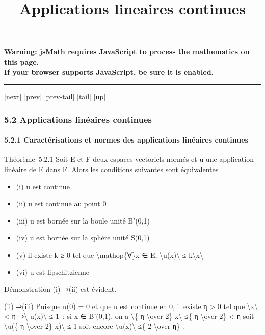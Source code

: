 \documentclass[]{article}
\title{Applications lineaires continues}
\author{}
\date{}
\begin{document}
\maketitle

\textbf{Warning: \href{http://www.math.union.edu/locate/jsMath}{jsMath}
requires JavaScript to process the mathematics on this page.\\ If your
browser supports JavaScript, be sure it is enabled.}

\begin{center}\rule{3in}{0.4pt}\end{center}

{[}\href{coursse29.html}{next}{]} {[}\href{coursse27.html}{prev}{]}
{[}\href{coursse27.html\#tailcoursse27.html}{prev-tail}{]}
{[}\hyperref[tailcoursse28.html]{tail}{]}
{[}\href{coursch6.html\#coursse28.html}{up}{]}

\subsubsection{5.2 Applications linéaires continues}

\paragraph{5.2.1 Caractérisations et normes des applications linéaires
continues}

Théorème~5.2.1 Soit E et F deux espaces vectoriels normés et u une
application linéaire de E dans F. Alors les conditions suivantes sont
équivalentes

\begin{itemize}
\itemsep1pt\parskip0pt
\item
  (i) u est continue
\item
  (ii) u est continue au point 0
\item
  (iii) u est bornée sur la boule unité B'(0,1)
\item
  (iv) u est bornée sur la sphère unité S(0,1)
\item
  (v) il existe k ≥ 0 tel que \textbackslash{}mathop\{∀\}x ∈ E,
  \textbackslash{}\textbar{}u(x)\textbackslash{}\textbar{} ≤
  k\textbackslash{}\textbar{}x\textbackslash{}\textbar{}
\item
  (vi) u est lipschitzienne
\end{itemize}

Démonstration (i) ⇒(ii) est évident.

(ii) ⇒(iii) Puisque u(0) = 0 et que u est continue en 0, il existe η
\textgreater{} 0 tel que
\textbackslash{}\textbar{}x\textbackslash{}\textbar{} \textless{} η
⇒\textbackslash{}\textbar{} u(x)\textbackslash{}\textbar{} ≤ 1~; si x ∈
B'(0,1), on a \textbackslash{}\textbar{}\{ η \textbackslash{}over 2\}
x\textbackslash{}\textbar{} ≤\{ η \textbackslash{}over 2\} \textless{} η
soit \textbackslash{}\textbar{}u(\{ η \textbackslash{}over 2\}
x)\textbackslash{}\textbar{} ≤ 1 soit encore
\textbackslash{}\textbar{}u(x)\textbackslash{}\textbar{} ≤\{ 2
\textbackslash{}over η\} .
\end{document}
